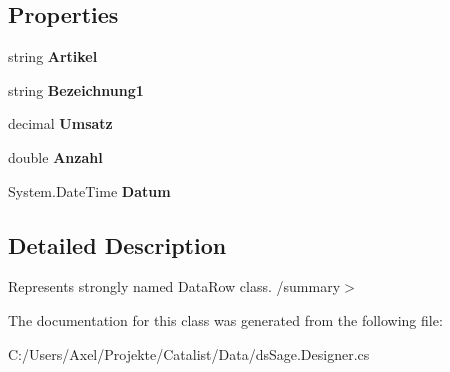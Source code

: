 \subsection*{Properties}
\begin{DoxyCompactItemize}
\item 
string {\bfseries Artikel}\hypertarget{class_products_1_1_data_1_1ds_sage_1_1_product_sales_row_a511854e1736f187df2f62f9a201a4ef9}{}\label{class_products_1_1_data_1_1ds_sage_1_1_product_sales_row_a511854e1736f187df2f62f9a201a4ef9}

\item 
string {\bfseries Bezeichnung1}\hypertarget{class_products_1_1_data_1_1ds_sage_1_1_product_sales_row_a5ae3d64444058a61fdd226ae86256fa3}{}\label{class_products_1_1_data_1_1ds_sage_1_1_product_sales_row_a5ae3d64444058a61fdd226ae86256fa3}

\item 
decimal {\bfseries Umsatz}\hypertarget{class_products_1_1_data_1_1ds_sage_1_1_product_sales_row_a19599cd1303c1131bbe5bd2537d3b4f9}{}\label{class_products_1_1_data_1_1ds_sage_1_1_product_sales_row_a19599cd1303c1131bbe5bd2537d3b4f9}

\item 
double {\bfseries Anzahl}\hypertarget{class_products_1_1_data_1_1ds_sage_1_1_product_sales_row_ae1c40961e72cba8143cad9984430ef36}{}\label{class_products_1_1_data_1_1ds_sage_1_1_product_sales_row_ae1c40961e72cba8143cad9984430ef36}

\item 
System.\+Date\+Time {\bfseries Datum}\hypertarget{class_products_1_1_data_1_1ds_sage_1_1_product_sales_row_ac2cc23be57b2d192aba55670e7e71958}{}\label{class_products_1_1_data_1_1ds_sage_1_1_product_sales_row_ac2cc23be57b2d192aba55670e7e71958}

\end{DoxyCompactItemize}


\subsection{Detailed Description}
Represents strongly named Data\+Row class. /summary$>$ 

The documentation for this class was generated from the following file\+:\begin{DoxyCompactItemize}
\item 
C\+:/\+Users/\+Axel/\+Projekte/\+Catalist/\+Data/ds\+Sage.\+Designer.\+cs\end{DoxyCompactItemize}

